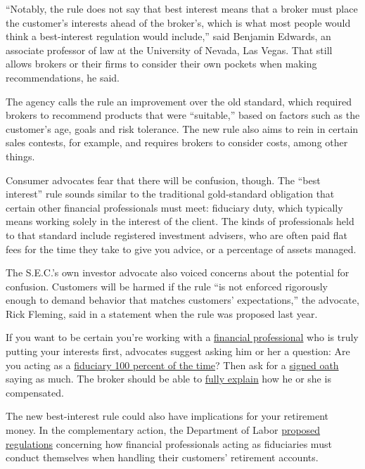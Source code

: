 ``Notably, the rule does not say that best interest means that a broker
must place the customer's interests ahead of the broker's, which is what
most people would think a best-interest regulation would include,'' said
Benjamin Edwards, an associate professor of law at the University of
Nevada, Las Vegas. That still allows brokers or their firms to consider
their own pockets when making recommendations, he said.

The agency calls the rule an improvement over the old standard, which
required brokers to recommend products that were ``suitable,'' based on
factors such as the customer's age, goals and risk tolerance. The new
rule also aims to rein in certain sales contests, for example, and
requires brokers to consider costs, among other things.

Consumer advocates fear that there will be confusion, though. The ``best
interest'' rule sounds similar to the traditional gold-standard
obligation that certain other financial professionals must meet:
fiduciary duty, which typically means working solely in the interest of
the client. The kinds of professionals held to that standard include
registered investment advisers, who are often paid flat fees for the
time they take to give you advice, or a percentage of assets managed.

The S.E.C.'s own investor advocate also voiced concerns about the
potential for confusion. Customers will be harmed if the rule ``is not
enforced rigorously enough to demand behavior that matches customers'
expectations,'' the advocate, Rick Fleming, said in a statement when the
rule was proposed last year.

If you want to be certain you're working with a
\href{https://www.nytimes.com/2020/02/10/smarter-living/the-young-persons-guide-to-investing.html}{financial
professional} who is truly putting your interests first, advocates
suggest asking him or her a question: Are you acting as a
\href{https://twitter.com/FiduciaryPath/status/1136357717776457729}{fiduciary
100 percent of the time}? Then ask for a
\href{http://www.thefiduciarystandard.org/wp-content/uploads/2015/02/fiduciaryoath_individual.pdf}{signed
oath} saying as much. The broker should be able to
\href{https://www.nytimes.com/2017/02/10/your-money/the-21-questions-youre-going-to-need-to-ask-about-investment-fees.html}{fully
explain} how he or she is compensated.

The new best-interest rule could also have implications for your
retirement money. In the complementary action, the Department of Labor
\href{https://www.dol.gov/agencies/ebsa/about-ebsa/our-activities/resource-center/fact-sheets/improving-investment-advice-for-workers-and-retirees}{proposed
regulations} concerning how financial professionals acting as
fiduciaries must conduct themselves when handling their customers'
retirement accounts.

